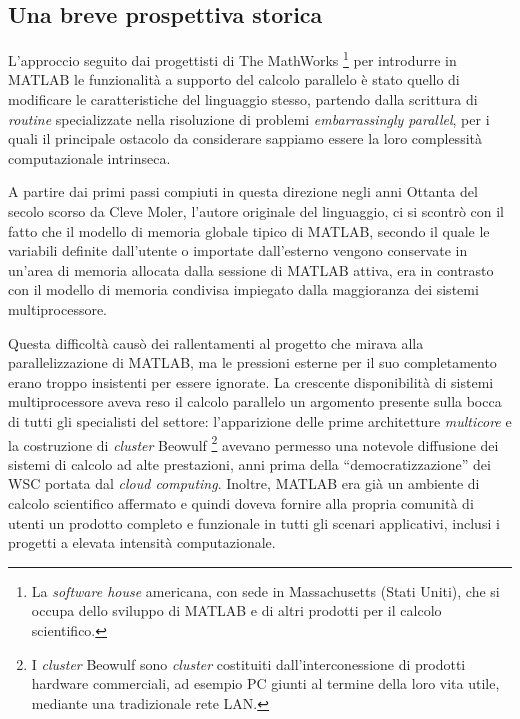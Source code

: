 \nocite{Sharma2009}
\subsection{Una breve prospettiva storica}
L'approccio seguito dai progettisti di The MathWorks \footnote{La \textit{software house} americana, con sede in Massachusetts (Stati Uniti), che si occupa dello sviluppo di MATLAB e di altri prodotti per il calcolo scientifico.}
per introdurre in MATLAB le funzionalit\`a a supporto del calcolo parallelo \`e stato quello di modificare le caratteristiche del linguaggio 
stesso, partendo dalla scrittura di \textit{routine} specializzate nella risoluzione di problemi \textit{embarrassingly parallel}, per i quali il principale ostacolo da considerare
sappiamo essere la loro complessit\`a computazionale intrinseca. 

A partire dai primi passi compiuti in questa direzione negli anni Ottanta del secolo scorso da Cleve Moler, l'autore originale del linguaggio, ci si scontr\`o 
con il fatto che il modello di memoria globale tipico di MATLAB, secondo il quale le variabili definite dall'utente o importate dall'esterno vengono conservate 
in un'area di memoria allocata dalla sessione di MATLAB attiva, era in contrasto con il modello di memoria condivisa impiegato dalla maggioranza dei sistemi 
multiprocessore.

Questa difficoltà causò dei rallentamenti al progetto che mirava alla parallelizzazione di MATLAB, ma le pressioni esterne per il suo completamento erano troppo insistenti per essere ignorate.\newline
La crescente disponibilit\`a di sistemi multiprocessore aveva reso il calcolo parallelo un argomento presente sulla bocca di tutti gli specialisti del 
settore: l'apparizione delle prime architetture \textit{multicore} e la costruzione di \textit{cluster} Beowulf \footnote{I \textit{cluster} Beowulf sono \textit{cluster} costituiti dall'interconessione di prodotti hardware commerciali, ad esempio PC giunti al termine della loro vita utile, mediante una tradizionale rete LAN. } avevano permesso una notevole diffusione dei sistemi di calcolo ad alte prestazioni, anni prima della \enquote{democratizzazione} dei WSC portata dal \textit{cloud computing}.\newline   
Inoltre, MATLAB era gi\`a un ambiente di calcolo scientifico affermato e quindi doveva fornire alla propria comunit\`a di utenti un prodotto completo e funzionale 
in tutti gli scenari applicativi, inclusi i progetti a elevata intensit\`a computazionale.

